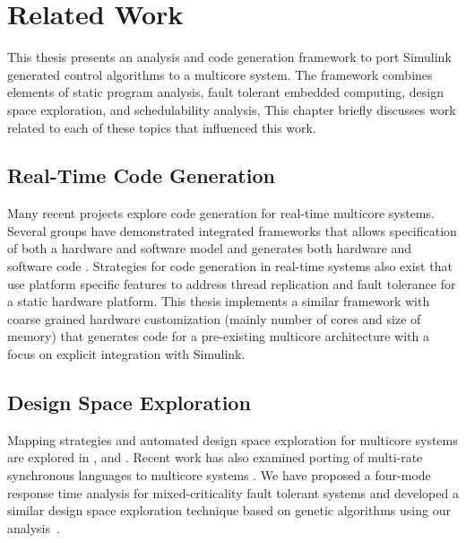 
\chapter{Related Work} %

\label{c:related} %


	This thesis presents an analysis and code generation framework to port Simulink generated control algorithms to a multicore system. 
	The framework combines elements of static program analysis, fault tolerant embedded computing, design space exploration, and schedulability analysis,
	This chapter briefly discusses work related to each of these topics that influenced this work.

\section{Real-Time Code Generation}

	Many recent projects explore code generation for real-time multicore systems. 
	Several groups have demonstrated integrated frameworks that allows specification of both a hardware and software model and generates both hardware and software code \cite{goossens2013compsoc,gauthier2001automatic}. 
	Strategies for code generation in real-time systems also exist that use platform specific features to address thread replication and fault tolerance \cite{huang2012framework} for a static hardware platform. 
	This thesis implements a similar framework with coarse grained hardware customization (mainly number of cores and size of memory) that generates code for a pre-existing multicore architecture with a focus on explicit integration with Simulink.
	
\section{Design Space Exploration}

Mapping strategies and automated design space exploration for multicore systems are explored in \cite{bolchini2013reliability}, and \cite{kang2014static}. Recent work has also examined porting of multi-rate synchronous languages to multicore systems \cite{puffitsch2013mapping}. We have proposed a four-mode response time analysis for mixed-criticality fault tolerant systems and developed a similar design space exploration technique based on genetic algorithms using our analysis~\cite{albayati2016modes}.

